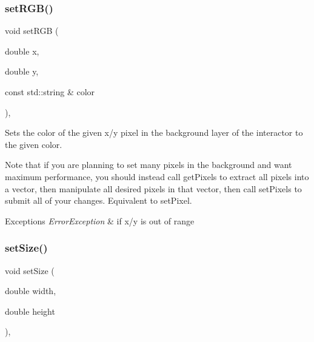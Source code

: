 \subsubsection{\texorpdfstring{set\+R\+G\+B()}{setRGB()}\hspace{0.1cm}{\footnotesize\ttfamily [3/3]}}
{\footnotesize\ttfamily void set\+R\+GB (\begin{DoxyParamCaption}\item[{double}]{x,  }\item[{double}]{y,  }\item[{const std\+::string \&}]{color }\end{DoxyParamCaption})\hspace{0.3cm}{\ttfamily [virtual]}, {\ttfamily [inherited]}}



Sets the color of the given x/y pixel in the background layer of the interactor to the given color. 

Note that if you are planning to set many pixels in the background and want maximum performance, you should instead call get\+Pixels to extract all pixels into a vector, then manipulate all desired pixels in that vector, then call set\+Pixels to submit all of your changes. Equivalent to set\+Pixel.


\begin{DoxyExceptions}{Exceptions}
{\em Error\+Exception} & if x/y is out of range \\
\hline
\end{DoxyExceptions}
\mbox{\label{classsgl_1_1GInteractor_aca25d49481f9bf5fc8f7df4c086c4ce7}} 
\subsubsection{\texorpdfstring{set\+Size()}{setSize()}\hspace{0.1cm}{\footnotesize\ttfamily [1/2]}}
{\footnotesize\ttfamily void set\+Size (\begin{DoxyParamCaption}\item[{double}]{width,  }\item[{double}]{height }\end{DoxyParamCaption})\hspace{0.3cm}{\ttfamily [virtual]}, {\ttfamily [inherited]}}




